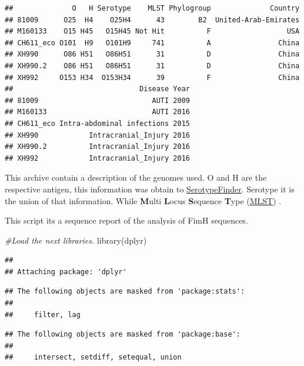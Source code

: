 \documentclass[
]{article}
\newenvironment{Shaded}{\begin{snugshade}}{\end{snugshade}}
\newcommand{\CommentTok}[1]{\textcolor[rgb]{0.56,0.35,0.01}{\textit{#1}}}
\newcommand{\FunctionTok}[1]{\textcolor[rgb]{0.00,0.00,0.00}{#1}}
\newcommand{\NormalTok}[1]{#1}
\begin{document}
\begin{verbatim}
##              O   H Serotype    MLST Phylogroup              Country
## 81009      O25  H4    O25H4      43        B2  United-Arab-Emirates
## M160133    O15 H45   O15H45 Not Hit          F                  USA
## CH611_eco O101  H9   O101H9     741          A                China
## XH990      O86 H51   O86H51      31          D                China
## XH990.2    O86 H51   O86H51      31          D                China
## XH992     O153 H34  O153H34      39          F                China
##                              Disease Year
## 81009                           AUTI 2009
## M160133                         AUTI 2016
## CH611_eco Intra-abdominal infections 2015
## XH990            Intracranial_Injury 2016
## XH990.2          Intracranial_Injury 2016
## XH992            Intracranial_Injury 2016
\end{verbatim}

This archive contain a description of the genomes used. O and H are the
respective antigen, this information was obtain to
\href{https://cge.cbs.dtu.dk/services/SerotypeFinder/}{SerotypeFinder}.
Serotype it is the union of that information. While \textbf{M}ulti
\textbf{L}ocus \textbf{S}equence \textbf{T}ype
(\href{https://pubmlst.org/organisms/escherichia-spp}{MLST}) .

This script its a sequence report of the analysis of FimH sequences.

\begin{Shaded}
\begin{Highlighting}[]
\CommentTok{\#Load the next libraries.}
\FunctionTok{library}\NormalTok{(dplyr)}
\end{Highlighting}
\end{Shaded}

\begin{verbatim}
## 
## Attaching package: 'dplyr'
\end{verbatim}

\begin{verbatim}
## The following objects are masked from 'package:stats':
## 
##     filter, lag
\end{verbatim}

\begin{verbatim}
## The following objects are masked from 'package:base':
## 
##     intersect, setdiff, setequal, union
\end{verbatim}
\end{document}
